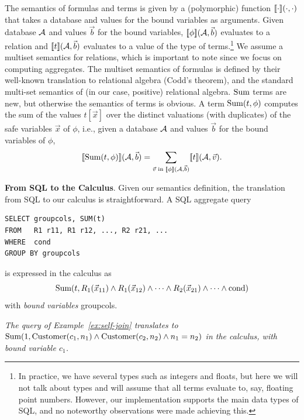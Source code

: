 The semantics of formulas and terms is given by a (polymorphic) function
$\lbrack\!\lbrack\cdot\rbrack\!\rbrack(\cdot, \cdot)$ that takes a database and values for the
bound variables as arguments. Given database $\db$ and values $\vec{b}$ for
the bound variables,
$\Bracks{\phi}(\db, \vec{b})$ evaluates to a relation and
$\Bracks{t}(\db, \vec{b})$ evaluates to a value of the type of
terms.\footnote{In practice,
we have several types such as integers and floats, but
here we will not talk about types and will assume that all terms evaluate to,
say, floating point numbers. However, our implementation supports the
main data types of SQL, and no noteworthy observations were made achieving
this.}
We assume a multiset semantics for relations, which is important to note
since we focus on computing aggregates. The multiset semantics of formulas
is defined by their well-known translation to relational algebra
(Codd's theorem), and the standard multi-set semantics of
(in our case, positive) relational algebra. 
$\mbox{Sum}$ terms are new, but otherwise the
semantics of terms is obvious.
A term $\mbox{Sum}(t, \phi)$
computes the sum of the values $t[\vec{x}]$
over the distinct valuations (with duplicates)
of the safe variables $\vec{x}$ of $\phi$, i.e.,
given a database $\db$ and values $\vec{b}$ for the bound variables of $\phi$,
\[
\Bracks{\AggSum(t, \phi)}(\db, \vec{b}) =
\sum_{\vec{v} \;\mathrm{in}\; \Bracks{\phi}(\db, \vec{b})} \Bracks{t}(\db, \vec{v}).
\]


{\bf From SQL to the Calculus}.
Given our semantics definition, the translation from SQL to our calculus is
straightforward.
%
%
A SQL aggregate query
\begin{verbatim}
SELECT groupcols, SUM(t)
FROM   R1 r11, R1 r12, ..., R2 r21, ...
WHERE  cond
GROUP BY groupcols
\end{verbatim}
is expressed in the calculus as
\[
\mbox{Sum}(t, R_1(\vec{x}_{11}) \land R_1(\vec{x}_{12}) \land \dots
\land R_2(\vec{x}_{21}) \land \dots \land \mbox{cond})
\]
with {\em bound variables} groupcols.


\begin{example}\em
\label{ex:self-join-calc}
The query of Example~\ref{ex:self-join} translates to
$\mbox{Sum}(1, \mbox{Customer}(c_1,n_1) \land \mbox{Customer}(c_2, n_2) \land
n_1=n_2)$ in the calculus, with bound variable $c_1$.
\punto
\end{example}


